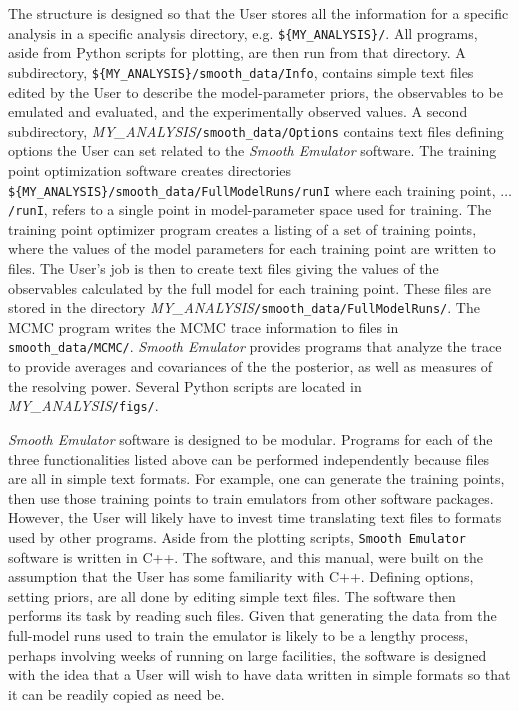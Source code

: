 \documentclass[12pt]{article}
\numberwithin{equation}{section}
\numberwithin{figure}{section}
\begin{document}
The structure is designed so that the User stores all the information for a specific analysis in a specific analysis directory, e.g. {\tt  \$\{MY\_ANALYSIS\}/}. All programs, aside from Python scripts for plotting, are then run from that directory.  A subdirectory, {\tt  \$\{MY\_ANALYSIS\}/smooth\_data/Info}, contains simple text files edited by the User to describe the model-parameter priors, the observables to be emulated and evaluated, and the experimentally observed values. A second subdirectory, \textit{MY\_ANALYSIS}{\tt /smooth\_data/Options} contains text files defining options the User can set related to the {\it Smooth Emulator} software. The training point optimization software creates directories {\tt  \$\{MY\_ANALYSIS\}/smooth\_data/FullModelRuns/runI} where each training point, {\tt $\hdots$/runI}, refers to a single point in model-parameter space used for training. The training point optimizer program creates a listing of a set of training points, where the values of the model parameters for each training point are written to files. The User's job is then to create text files giving the values of the observables calculated by the full model for each training point. These files are stored in the directory \textit{MY\_ANALYSIS}{\tt /smooth\_data/FullModelRuns/}. The MCMC program writes the MCMC trace information to files in {\tt smooth\_data/MCMC/}. {\it Smooth Emulator} provides programs that analyze the trace to provide averages and covariances of the the posterior, as well as measures of the resolving power. Several Python scripts are located in \textit{MY\_ANALYSIS}{\tt /figs/}.  

{\it Smooth Emulator} software is designed to be modular. Programs for each of the three functionalities listed above can be performed independently because files are all in simple text formats. For example, one can generate the training points, then use those training points to train emulators from other software packages. However, the User will likely have to invest time translating text files to formats used by other programs. Aside from the plotting scripts, {\tt Smooth Emulator} software is written in C++. The software, and this manual, were built on the assumption that the User has some familiarity with C++. Defining options, setting priors, are all done by editing simple text files. The software then performs its task by reading such files. Given that generating the data from the full-model runs used to train the emulator is likely to be a lengthy process, perhaps involving weeks of running on large facilities, the software is designed with the idea that a User will wish to have data written in simple formats so that it can be readily copied as need be. 
\end{document}
